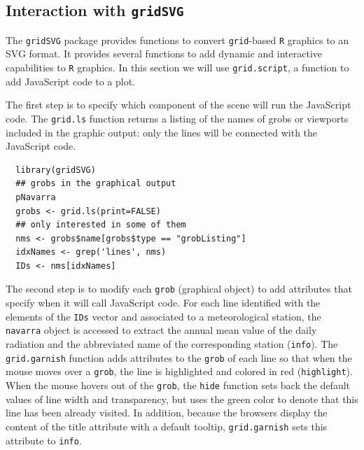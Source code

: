 \documentclass[smallroyalvopaper]{memoir}
\begin{document}
\subsection{\floweroneleft Interaction with \texttt{gridSVG}}
\label{sec:org1d2f271}
The \texttt{gridSVG} package provides functions to convert \texttt{grid}-based \texttt{R}
graphics to an SVG format. It provides several functions to add
dynamic and interactive capabilities to \texttt{R} graphics. In this section
we will use \texttt{grid.script}, a function to add JavaScript code to a
plot.

The first step is to specify which component of the scene
will run the JavaScript code. The \texttt{grid.ls} function  returns a
listing of the names of grobs or viewports included in the graphic
output: only the lines will be connected with the JavaScript
code. 


\lstset{language=r,label= ,caption= ,captionpos=b,numbers=none}
\begin{lstlisting}
  library(gridSVG)
  ## grobs in the graphical output
  pNavarra
  grobs <- grid.ls(print=FALSE)
  ## only interested in some of them
  nms <- grobs$name[grobs$type == "grobListing"]
  idxNames <- grep('lines', nms)
  IDs <- nms[idxNames]
\end{lstlisting}

The second step is to modify each \texttt{grob} (graphical object) to add
attributes that specify when it will call JavaScript code. For each
line identified with the elements of the \texttt{IDs} vector and associated
to a meteorological station, the \texttt{navarra} object is accessed to
extract the annual mean value of the daily radiation and the
abbreviated name of the corresponding station (\texttt{info}).  The
\texttt{grid.garnish} function adds attributes to the \texttt{grob} of each line so
that when the mouse moves over a \texttt{grob}, the line is highlighted and
colored in red (\texttt{highlight}). When the mouse hovers out of the \texttt{grob},
the \texttt{hide} function sets back the default values of line width and
transparency, but uses the green color to denote that this line has
been already visited. In addition, because the browsers display the
content of the title attribute with a default tooltip, \texttt{grid.garnish}
sets this attribute to \texttt{info}.

\end{document}

